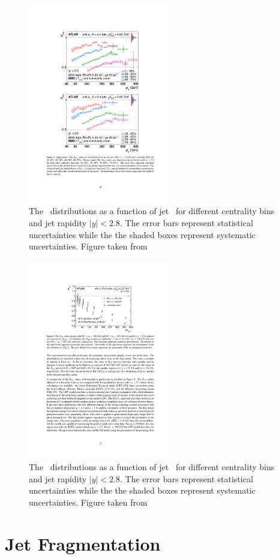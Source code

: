 \begin{figure}[htbp]
\begin{center}
\includegraphics[width=0.55\textwidth]{figures/jetMeasurements/raa}
\caption{The \RAA\ distributions as a function of jet \pt\ for different centrality bins and jet rapidity $|y| < 2.8$. The error bars represent statistical uncertainties while the the shaded boxes represent systematic uncertainties. Figure taken from \cite{2019108}}
\label{fig:raa}
\end{center}
\end{figure}

\begin{figure}[htbp]
\begin{center}
\includegraphics[width=0.55\textwidth]{figures/jetMeasurements/raa_centDep}
\caption{The \RAA\ distributions as a function of jet \pt\ for different centrality bins and jet rapidity $|y| < 2.8$. The error bars represent statistical uncertainties while the the shaded boxes represent systematic uncertainties. Figure taken from \cite{2019108}}
\label{fig:raa_centDep}
\end{center}
\end{figure}









\section{Jet Fragmentation}



